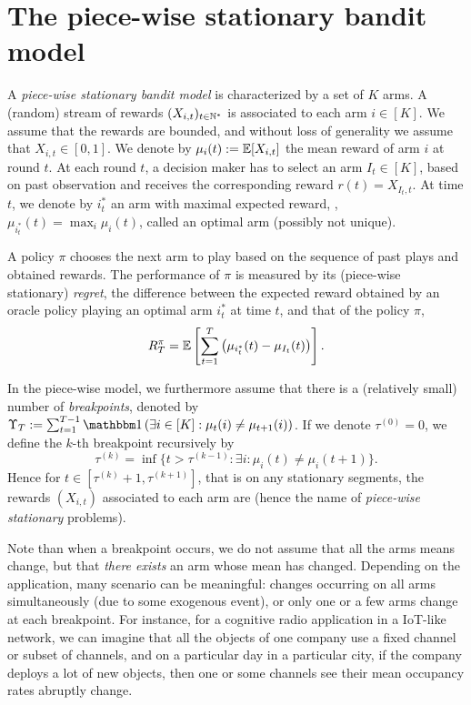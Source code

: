 

\section{The piece-wise stationary bandit model}
\label{sec:6:BanditSetting}

A \emph{piece-wise stationary bandit model} is characterized by a set of $K$ arms.
A (random) stream of rewards $(X_{i,t})_{t\in\mathbb{N}^*}$ is associated to each arm $i \in [K]$. We assume that the rewards are bounded, and without loss of generality we assume that $X_{i,t} \in [0,1]$. We denote by $\mu_{i}(t) :=  \mathbb{E}[X_{i,t}]$ the mean reward of arm $i$ at round $t$. At each round $t$, a decision maker has to select an arm $I_t\in[K]$, based on past observation and receives the corresponding reward $r(t) = X_{I_t,t}$. At time $t$, we denote by $i_t^*$ an arm with maximal expected reward, \ie, $\mu_{i_t^*}(t) = \max_i \mu_i(t)$, called an optimal arm (possibly not unique).

A policy $\pi$ chooses the next arm to play based on the sequence of past plays and obtained rewards.
The performance of $\pi$ is measured by its (piece-wise stationary) \emph{regret}, the difference between the expected reward obtained by an oracle policy playing an optimal arm $i^*_t$ at time $t$, and that of the policy $\pi$,
%
\begin{equation}\label{def:6:nti}
    R_T^{\pi} = \mathbb{E}\left[\sum_{t=1}^T \left(\mu_{i^*_t}(t) - \mu_{I_t}(t)\right)\right].
\end{equation}


In the piece-wise \iid{} model, we furthermore assume that there is a (relatively small) number of \emph{breakpoints}, denoted by $\Upsilon_T:=\sum_{t=1}^{T-1} \indic\left(\exists i\in[K]: \mu_t(i) \neq \mu_{t+1}(i)\right)$.
If we denote $\tau^{(0)} = 0$, we define the $k$-th breakpoint recursively by
\begin{equation}
    \tau^{(k)} = \inf\{t > \tau^{(k-1)} : \exists i : \mu_i(t) \neq \mu_{i}(t+1)\}.
\end{equation}
%
Hence for $t\in[\tau^{(k)} + 1,\tau^{(k+1)}]$, that is on any stationary segments, the rewards $(X_{i,t})$ associated to each arm are \iid{} (hence the name of \emph{piece-wise stationary} problems).

Note than when a breakpoint occurs, we do not assume that all the arms means  change, but that \emph{there exists} an arm whose mean has changed.
Depending on the application, many scenario can be meaningful: changes occurring on all arms simultaneously (due to some exogenous event), or only one or a few arms change at each breakpoint.
For instance, for a cognitive radio application in a IoT-like network, we can imagine that all the objects of one company use a fixed channel or subset of channels, and on a particular day in a particular city, if the company deploys a lot of new objects, then one or some channels see their mean occupancy rates abruptly change.

